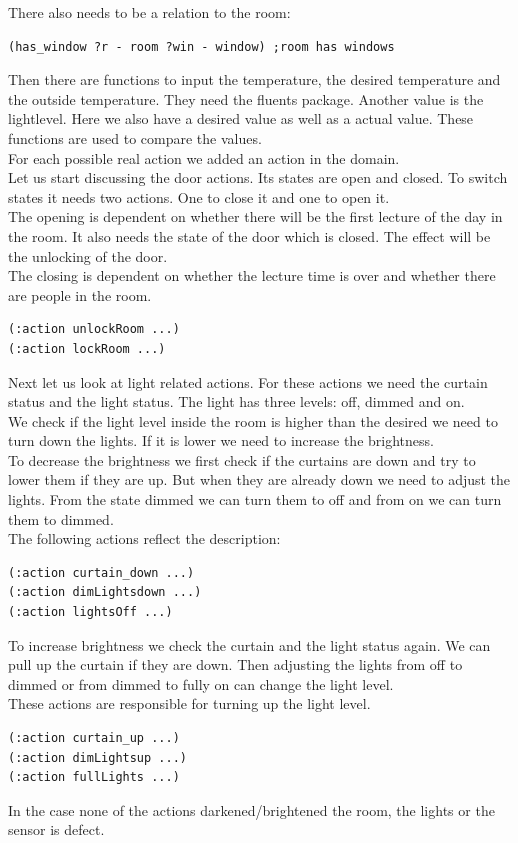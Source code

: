 \documentclass[runningheads]{llncs}
\begin{document}
There also needs to be a relation to the room:
\begin{lstlisting}
(has_window ?r - room ?win - window) ;room has windows
\end{lstlisting}
Then there are functions to input the temperature, the desired temperature and the outside temperature. They need the fluents package.
Another value is the lightlevel. Here we also have a desired value as well as a actual value. These functions are used to compare the values.\\ 
\newline
For each possible real action we added an action in the domain. \\
Let us start discussing the door actions. Its states are open and closed. To switch states it needs two actions. One to close it and one to open it. \\
The opening is dependent on whether there will be the first lecture of the day in the room. It also needs the state of the door which is closed. The effect will be the unlocking of the door. \\
The closing is dependent on whether the lecture time is over and whether there are people in the room. \\
\begin{lstlisting}
(:action unlockRoom ...)
(:action lockRoom ...)
\end{lstlisting}

Next let us look at light related actions. 
For these actions we need the curtain status and the light status. The light has three levels: off, dimmed and on.\\ 
We check if the light level inside the room is higher than the desired we need to turn down the lights. If it is lower we need to increase the brightness.\\ 

To decrease the brightness we first check if the curtains are down and try to lower them if they are up. But when they are already down we need to adjust the lights. From the state dimmed we can turn them to off and from on we can turn them to dimmed. \\
The following actions reflect the description:
\begin{lstlisting}
(:action curtain_down ...)
(:action dimLightsdown ...)
(:action lightsOff ...)
\end{lstlisting}
To increase brightness we check the curtain and the light status again. We can pull up the curtain if they are down. Then adjusting the lights from off to dimmed or from dimmed to fully on can change the light level. \\
These actions are responsible for turning up the light level.
\begin{lstlisting}
(:action curtain_up ...)
(:action dimLightsup ...)
(:action fullLights ...)
\end{lstlisting}
In the case none of the actions darkened/brightened the room, the lights or the sensor is defect.\\
\end{document}
